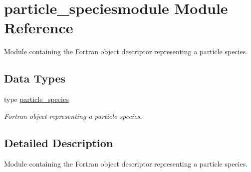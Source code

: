 \hypertarget{namespaceparticle__speciesmodule}{}\section{particle\+\_\+speciesmodule Module Reference}
\label{namespaceparticle__speciesmodule}


Module containing the Fortran object descriptor representing a particle species.  


\subsection*{Data Types}
\begin{DoxyCompactItemize}
\item 
type \hyperlink{structparticle__speciesmodule_1_1particle__species}{particle\+\_\+species}
\begin{DoxyCompactList}\small\item\em Fortran object representing a particle species. \end{DoxyCompactList}\end{DoxyCompactItemize}


\subsection{Detailed Description}
Module containing the Fortran object descriptor representing a particle species. 